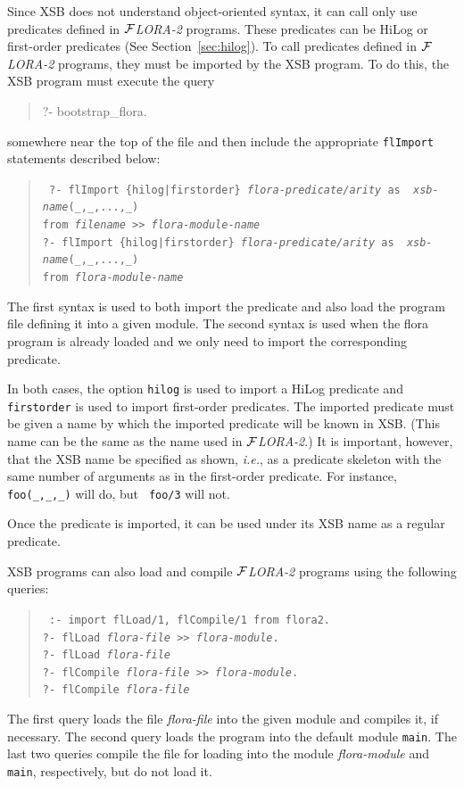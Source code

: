 \documentclass[11pt]{article}
\newcommand{\FLORA}{{\mbox{${\cal F}${\small\it LORA}\rm\emph{-2}}}\xspace}
\begin{document}
Since XSB does not understand object-oriented syntax, it can call only use
predicates defined in \FLORA programs. These predicates can be HiLog or
first-order predicates (See Section~\ref{sec:hilog}). To call predicates
defined in \FLORA programs, they must be imported by the XSB program.
To do this, the XSB program must execute the query
\begin{quote}
 ?- bootstrap\_flora.  
\end{quote}
somewhere near the top of the file and then include the appropriate
{\tt flImport} statements described below:
\begin{quote}
  \tt
   ?- flImport \{hilog|firstorder\} {\it flora-predicate/arity} as {\it
     xsb-name}(\_,\_,...,\_)\\
   \hspace*{5cm}from {\it filename} >> {\it flora-module-name}
   \\
   ?- flImport \{hilog|firstorder\} {\it flora-predicate/arity} as {\it 
     xsb-name}(\_,\_,...,\_)\\
   \hspace*{5cm}from {\it flora-module-name}
\end{quote}
The first syntax is used to both import the predicate and also load the
program file defining it into a given module. The second syntax is used
when the flora program is already loaded and we only need to import the
corresponding predicate.

In both cases, the option {\tt hilog} is used to import a HiLog predicate
and {\tt firstorder} is used to import first-order predicates. The imported
predicate must be given a name by which the imported predicate will be
known in XSB.  (This name can be the same as the name used in \FLORA.)  It
is important, however, that the XSB name be specified as shown, {\it i.e.},
as a predicate skeleton with the same number of arguments as in the
first-order predicate. For instance, {\tt foo(\_,\_,\_)} will do, but {\tt
  foo/3} will not.

Once the predicate is imported, it can be used under its XSB name as a
regular predicate.

XSB programs can also load and compile \FLORA programs using the following
queries: 
\begin{quote}
 \tt
 :- import flLoad/1, flCompile/1 from flora2.\\
 ?- flLoad  {\it flora-file} >> {\it flora-module}.\\
 ?- flLoad  {\it flora-file}\\
 ?- flCompile {\it flora-file} >> {\it flora-module}.\\
 ?- flCompile  {\it flora-file}
\end{quote}
The first query loads the file {\it flora-file\/} into the given module and
compiles it, if necessary. The second query loads the program into the
default module {\tt main}. The last two queries compile the file for
loading into the module {\it flora-module} and {\tt main}, respectively,
but do not load it.
\end{document}
